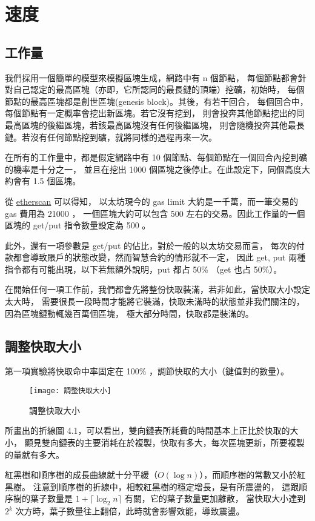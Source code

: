 \section{速度}

\subsection{工作量}
我們採用一個簡單的模型來模擬區塊生成，網路中有 n 個節點，
每個節點都會針對自己認定的最高區塊（亦即，它所認同的最長鏈的頂端）挖礦，初始時，
每個節點的最高區塊都是創世區塊(genesis block)。其後，有若干回合，
每個回合中，每個節點有一定概率會挖出新區塊。若它沒有挖到，
則會投奔其他節點挖出的同最高區塊的後繼區塊，若該最高區塊沒有任何後繼區塊，
則會隨機投奔其他最長鏈。若沒有任何節點挖到礦，就將同樣的過程再來一次。

在所有的工作量中，都是假定網路中有 10 個節點、每個節點在一個回合內挖到礦的機率是十分之一，
並且在挖出 1000 個區塊之後停止。在此設定下，同個高度大約會有 1.5 個區塊。

從 \href{https://etherscan.io/chart/gaslimit}{etherscan} 可以得知，
以太坊現今的 gas limit 大約是一千萬，而一筆交易的 gas 費用為 21000 ，
一個區塊大約可以包含 500 左右的交易。因此工作量的一個區塊的 get/put 指令數量設定為 500 。

此外，還有一項參數是 get/put 的佔比，對於一般的以太坊交易而言，
每次的付款都會導致賬戶的狀態改變，然而智慧合約的情形就不一定，
因此 get, put 兩種指令都有可能出現，以下若無額外說明，put 都占 50\% （get 也占 50\%）。

在開始任何一項工作前，我們都會先將整份快取裝滿，若非如此，當快取大小設定太大時，
需要很長一段時間才能將它裝滿，快取未滿時的狀態並非我們關注的，因為區塊鏈動輒幾百萬個區塊，
極大部分時間，快取都是裝滿的。

\subsection{調整快取大小}

第一項實驗將快取命中率固定在 100\% ，調節快取的大小（鍵值對的數量）。

\begin{figure}[h!]
\texttt{[image: 調整快取大小]}
\caption{調整快取大小}
\end{figure}

所畫出的折線圖 4.1，可以看出，雙向鏈表所耗費的時間基本上正比於快取的大小，
顯見雙向鏈表的主要消耗在於複製，快取有多大，每次區塊更新，所要複製的量就有多大。

紅黑樹和順序樹的成長曲線就十分平緩（$O(\log n)$），而順序樹的常數又小於紅黑樹。
注意到順序樹的折線中，相較紅黑樹的穩定增長，是有所震盪的，
這跟順序樹的葉子數量是 $1 + \lceil \log_2 n \rceil$ 有關，它的葉子數量更加離散，
當快取大小達到 $2^k$ 次方時，葉子數量往上翻倍，此時就會影響效能，導致震盪。

